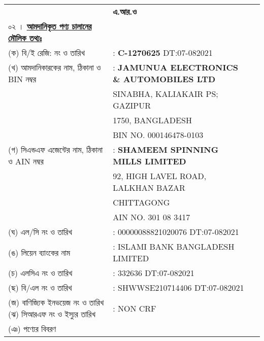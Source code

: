 \documentclass[11pt]{article}
\begin{document}
\begin{tabular}{lll}
& \textbf{এ.আর.ও} \\
০২ । \underline{\textbf {আমদানিকৃত পণ্য চালানের
মৌলিক তথ্যঃ}} & \\
\hspace{2em} (ক) বি/ই রেজি: নং ও তারিখ
& : \textbf{C-1270625}
\hspace{1em} DT:07-082021 \\
\hspace{2em} (খ) আমদানিকারকের নাম, ঠিকানা
ও BIN নম্বর
& : \textbf{JAMUNUA ELECTRONICS
\& AUTOMOBILES LTD} \\
& \hspace{4pt} SINABHA, KALIAKAIR PS; GAZIPUR \\
& \hspace{4pt} 1750, BANGLADESH \\
& \hspace{4pt} BIN NO. 000146478-0103 \\
\hspace{2em} (গ) সিএন্ডএফ এজেন্টের নাম, ঠিকানা
ও AIN নম্বর
& : \textbf{SHAMEEM SPINNING MILLS LIMITED} \\
& \hspace{4pt} 92, HIGH LAVEL ROAD, LALKHAN BAZAR \\
& \hspace{4pt} CHITTAGONG \\
& \hspace{4pt} AIN NO. 301 08 3417 \\
\hspace{2em} (ঘ) এল/সি নং ও তারিখ
& : 00000088821020076
\hspace{1em} DT:07-082021 \\
\hspace{2em} (ঙ) লিয়েন ব্যাংকের নাম
& : ISLAMI BANK BANGLADESH LIMITED \\
\hspace{2em} (চ) এলসিএ নং ও তারিখ
& : 332636
\hspace{1em} DT:07-082021 \\
\hspace{2em} (ছ) বি/এল নং ও তারিখ
& : SHWWSE210714406
\hspace{1em} DT:07-082021 \\
\hspace{2em} (জ) বাণিজ্যিক ইনভয়েজ নং ও তারিখ
\hspace{2em} (ঝ) সিআরএফ নং ও ইস্যুর তারিখ
& : NON CRF \\
\hspace{2em} (ঞ) পণ্যের বিবরণ

\end{tabular}
\end{document}
